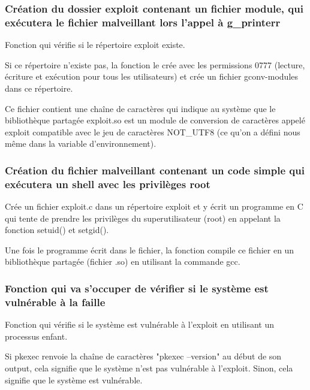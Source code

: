 \documentclass[12pt,a4paper]{article}
\begin{document}
            \begin{flushleft}
                \noindent 
            \end{flushleft}
            \subsubsection{Création du dossier exploit contenant un fichier module, qui exécutera le fichier malveillant lors l'appel à g\_printerr}
              
            \begin{flushleft}
                \noindent Fonction qui vérifie si le répertoire exploit existe.
                \item Si ce répertoire n'existe pas, la fonction le crée avec les permissions 0777 (lecture, écriture et exécution pour tous les utilisateurs) et crée un fichier gconv-modules dans ce répertoire. 
                \item Ce fichier contient une chaîne de caractères qui indique au système que le bibliothèque partagée exploit.so est un module de conversion de caractères appelé exploit compatible avec le jeu de caractères NOT\_UTF8 (ce qu'on a défini nous même dans la variable d'environnement).
            \end{flushleft}
            \subsubsection{Création du fichier malveillant contenant un code simple qui exécutera un shell avec les privilèges root}
              
            \begin{flushleft}
                \noindent Crée un fichier exploit.c dans un répertoire exploit et y écrit un programme en C qui tente de prendre les privilèges du superutilisateur (root) en appelant la fonction setuid() et setgid(). 
                \item Une fois le programme écrit dans le fichier, la fonction compile ce fichier en un bibliothèque partagée (fichier .so) en utilisant la commande gcc.
            \end{flushleft}
            
            \newpage
            \subsubsection{Fonction qui va s'occuper de vérifier si le système est vulnérable à la faille}
              
            \begin{flushleft}
                \noindent Fonction qui vérifie si le système est vulnérable à l'exploit en utilisant un processus enfant.
                \item Si pkexec renvoie la chaîne de caractères "pkexec --version" au début de son output, cela signifie que le système n'est pas vulnérable à l'exploit. Sinon, cela signifie que le système est vulnérable.
            \end{flushleft}
\end{document}
